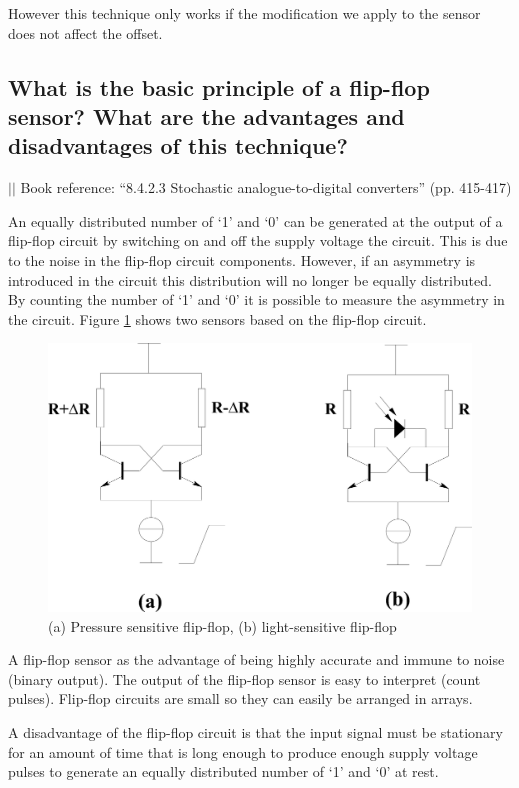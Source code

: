 \documentclass[10pt,a4paper]{article}
\newcommand{\bookref}[2]{\indent\indent\indent\indent $\vert\vert$ Book reference: ``#1'' (pp. #2) \newline}
\begin{document}
However this technique only works if the modification we apply to the sensor does not affect the offset.

\subsection{What is the basic principle of a flip-flop sensor? What are the advantages and disadvantages of this technique?}

\bookref{8.4.2.3 Stochastic analogue-to-digital converters}{415-417}

An equally distributed number of `1' and `0' can be generated at the output of a flip-flop circuit by switching on and off the supply voltage the circuit. This is due to the noise in the  flip-flop circuit components. However, if an asymmetry is introduced in the circuit this distribution will no longer be equally distributed. By counting the number of `1' and `0' it is possible to measure the asymmetry in the circuit. Figure \ref{fig:flip-flop} shows two sensors based on the flip-flop circuit.

\begin{figure}[h!]
    \centering
    \includegraphics{flip-flop.png}
    \caption{(a) Pressure sensitive flip-flop, (b) light-sensitive flip-flop}
    \label{fig:flip-flop}
\end{figure}

A flip-flop sensor as the advantage of being highly accurate and immune to noise (binary output). The output of the flip-flop sensor is easy to interpret (count pulses). Flip-flop circuits are small so they can easily be arranged in arrays.

A disadvantage of the flip-flop circuit is that the input signal must be stationary for an amount of time that is long enough to produce enough supply voltage pulses to generate an equally distributed number of `1' and `0' at rest. 
\end{document}
